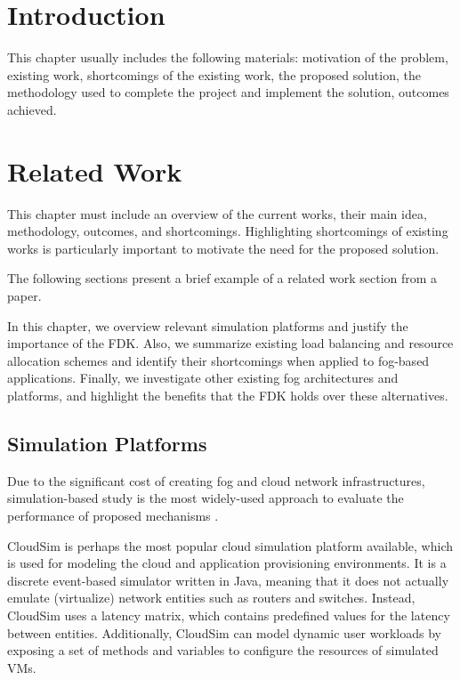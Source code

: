 \setlength{\parindent}{4ex}

\chapter{Introduction}
\label{chapter:Introduction} 

This chapter usually includes the following materials: motivation of the problem, existing work, shortcomings of the existing work, the proposed solution, the methodology used to complete the project and implement the solution, outcomes achieved.



\chapter{Related Work}
\label{RelatedWork}

This chapter must include an overview of the current works, their main idea, methodology, outcomes, and shortcomings.
Highlighting shortcomings of existing works is particularly important to motivate the need for the proposed solution.


The following sections present a brief example of a related work section from a paper.


In this chapter, we overview relevant simulation platforms and justify the importance of the FDK.
Also, we summarize existing load balancing and resource allocation schemes and identify their shortcomings when applied to fog-based applications.
Finally, we investigate other existing fog architectures and platforms, and highlight the benefits that the FDK holds over these alternatives.

\section{Simulation Platforms}
\label{SimulationPlatforms}

Due to the significant cost of creating fog and cloud network infrastructures, simulation-based study is the most widely-used approach to evaluate the performance of proposed mechanisms \cite{Skarlat2016resourceprovisioning, ansari2018, yin2018}.

CloudSim \cite{cloudsim} is perhaps the most popular cloud simulation platform available, which is used for modeling the cloud and application provisioning environments. 
It is a discrete event-based simulator written in Java, meaning that it does not actually emulate (virtualize) network entities such as routers and switches.
Instead, CloudSim uses a latency matrix, which contains predefined values for the latency between entities.
Additionally, CloudSim can model dynamic user workloads by exposing a set of methods and variables to configure the resources of simulated VMs.


